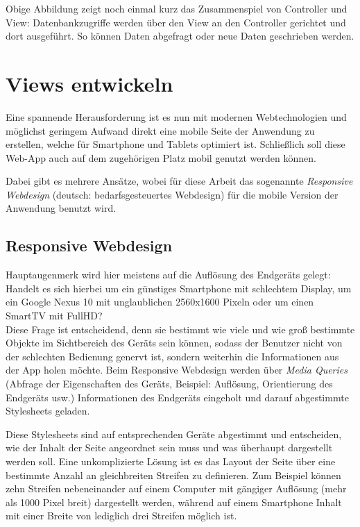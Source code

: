 Obige Abbildung zeigt noch einmal kurz das Zusammenspiel von Controller und View: Datenbankzugriffe werden über den View an den Controller gerichtet und dort ausgeführt. So können Daten abgefragt oder neue Daten geschrieben werden.

\section{Views entwickeln}
Eine spannende Herausforderung ist es nun mit modernen Webtechnologien und möglichst geringem Aufwand direkt eine mobile Seite der Anwendung zu erstellen, welche für Smartphone und Tablets optimiert ist. Schließlich soll diese Web-App auch auf dem zugehörigen Platz mobil genutzt werden können.\par

Dabei gibt es mehrere Ansätze, wobei für diese Arbeit das sogenannte \emph{Responsive Webdesign} (deutsch: bedarfsgesteuertes Webdesign) für die mobile Version der Anwendung benutzt wird.

\subsection{Responsive Webdesign}
Hauptaugenmerk wird hier meistens auf die Auflösung des Endgeräts gelegt: Handelt es sich hierbei um ein günstiges Smartphone mit schlechtem Display, um ein Google Nexus 10 mit unglaublichen 2560x1600 Pixeln oder um einen SmartTV mit FullHD?\\
Diese Frage ist entscheidend, denn sie bestimmt wie viele und wie groß bestimmte Objekte im Sichtbereich des Geräts sein können, sodass der Benutzer nicht von der schlechten Bedienung genervt ist, sondern weiterhin die Informationen aus der App holen möchte. Beim Responsive Webdesign werden über \emph{Media Queries} (Abfrage der Eigenschaften des Geräts, Beispiel: Auflösung, Orientierung des Endgeräts usw.) Informationen des Endgeräts eingeholt und darauf abgestimmte Stylesheets geladen.\par

Diese Stylesheets sind auf entsprechenden Geräte abgestimmt und entscheiden, wie der Inhalt der Seite angeordnet sein muss und was überhaupt dargestellt werden soll. Eine unkomplizierte Lösung ist es das Layout der Seite über eine bestimmte Anzahl an gleichbreiten Streifen zu definieren. Zum Beispiel können zehn Streifen nebeneinander auf einem Computer mit gängiger Auflösung (mehr als 1000 Pixel breit) dargestellt werden, während auf einem Smartphone Inhalt mit einer Breite von lediglich drei Streifen möglich ist.\par

